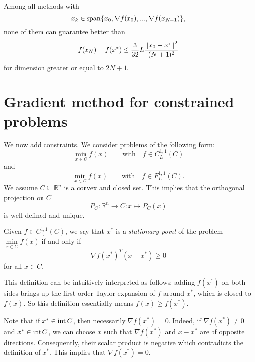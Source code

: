 Among all methods with
\begin{equation*}
x_k \in \mathrm{span}\{x_0, \nabla f(x_0), ..., \nabla f(x_{N-1})\},
\end{equation*}
none of them can guarantee better than
\begin{equation*}
f(x_N) - f(x^*) \le \frac{3}{32}L \frac{{\left\Vert x_0-x^* \right\Vert}^2}{(N+1)^2}
\end{equation*}
for dimension greater or equal to $2N+1$.

\section{Gradient method for constrained problems}

We now add constraints. We consider problems of the following form:
\begin{equation*}
\min_{x \in C} f(x) \qquad \text{with} \quad f \in C_L^{1,1}(C)
\end{equation*}
and
\begin{equation*}
\min_{x \in C} f(x) \qquad \text{with} \quad f \in F_L^{1,1}(C) .
\end{equation*}
We assume $C \subseteq \mathbb{R}^n$ is a convex and closed set. This implies that the orthogonal projection on $C$
\begin{equation*}
P_C : \mathbb{R}^n \to C : x \mapsto P_C(x)
\end{equation*}
is well defined and unique.

\begin{definition}
Given $f \in C_L^{1,1}(C)$, we say that $x^*$ is a \emph{stationary point} of the problem $\min\limits_{x \in C} f(x)$ if and only if
\begin{equation*}
\nabla f(x^*)^T(x-x^*) \ge 0
\end{equation*}
for all $x \in C$.
\end{definition}
This definition can be intuitively interpreted as follows: adding $f(x^*)$ on both sides brings up the first-order Taylor expansion of $f$ around $x^*$, which is closed to $f(x)$. So this definition essentially means $f(x) \ge f(x^*)$.

Note that if $x^* \in \mathrm{int}\, C$, then necessarily $\nabla f(x^*) = 0$.
Indeed, if $\nabla f(x^*) \neq 0$ and $x^* \in \mathrm{int}\, C$, we can choose $x$ such that $\nabla f(x^*)$ and $x-x^*$ are of opposite directions. Consequently, their scalar product is negative which contradicts the definition of $x^*$. This implies that $\nabla f(x^*) = 0$.

